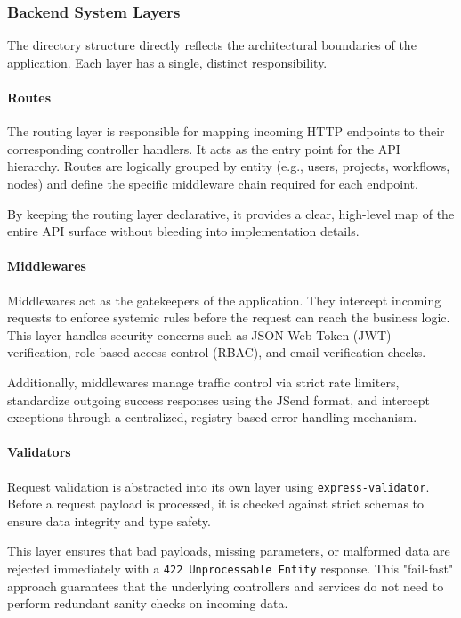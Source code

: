 \subsubsection{Backend System Layers}

The directory structure directly reflects the architectural boundaries of the application. Each layer has a single, distinct responsibility.

\paragraph{Routes}
The routing layer is responsible for mapping incoming HTTP endpoints to their corresponding controller handlers. It acts as the entry point for the API hierarchy. Routes are logically grouped by entity (e.g., users, projects, workflows, nodes) and define the specific middleware chain required for each endpoint. 

By keeping the routing layer declarative, it provides a clear, high-level map of the entire API surface without bleeding into implementation details.

\paragraph{Middlewares}
Middlewares act as the gatekeepers of the application. They intercept incoming requests to enforce systemic rules before the request can reach the business logic. This layer handles security concerns such as JSON Web Token (JWT) verification, role-based access control (RBAC), and email verification checks.

Additionally, middlewares manage traffic control via strict rate limiters, standardize outgoing success responses using the JSend format, and intercept exceptions through a centralized, registry-based error handling mechanism.

\paragraph{Validators}
Request validation is abstracted into its own layer using \texttt{express-validator}. Before a request payload is processed, it is checked against strict schemas to ensure data integrity and type safety.

This layer ensures that bad payloads, missing parameters, or malformed data are rejected immediately with a \texttt{422 Unprocessable Entity} response. This "fail-fast" approach guarantees that the underlying controllers and services do not need to perform redundant sanity checks on incoming data.

